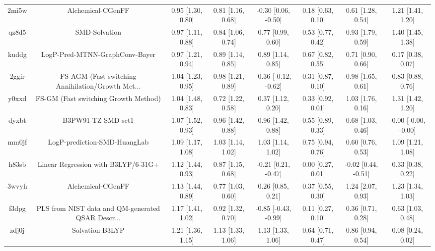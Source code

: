 \documentclass{article}
\begin{document}
\begin{center}
\begin{longtable}{|cccccccc|}
 2mi5w &                                  Alchemical-CGenFF &  0.95 [1.30, 0.80] &  0.81 [1.16, 0.68] &   -0.30 [0.06, -0.50] &  0.18 [0.63, 0.10] &     0.61 [1.28, 0.54] &     1.21 [1.41, 1.20] \\
 qz8d5 &                                      SMD-Solvation &  0.97 [1.11, 0.88] &  0.84 [1.06, 0.74] &     0.77 [0.99, 0.60] &  0.53 [0.77, 0.42] &     0.93 [1.79, 0.59] &     1.40 [1.45, 1.38] \\
 kuddg &                     LogP-Pred-MTNN-GraphConv-Bayer &  0.97 [1.21, 0.94] &  0.89 [1.14, 0.85] &     0.89 [1.14, 0.85] &  0.67 [0.82, 0.55] &     0.71 [0.90, 0.66] &     0.17 [0.38, 0.07] \\
 2ggir &  FS-AGM (Fast switching Annihilation/Growth Met... &  1.04 [1.23, 0.95] &  0.98 [1.21, 0.89] &  -0.36 [-0.12, -0.62] &  0.31 [0.87, 0.10] &     0.98 [1.65, 0.61] &     0.83 [0.88, 0.76] \\
 y0xxd &               FS-GM (Fast switching Growth Method) &  1.04 [1.48, 0.83] &  0.72 [1.22, 0.58] &     0.37 [1.12, 0.20] &  0.33 [0.92, 0.01] &     1.03 [1.76, 0.16] &     1.31 [1.42, 1.20] \\
 dyxbt &                                 B3PW91-TZ SMD set1 &  1.07 [1.52, 0.93] &  0.96 [1.42, 0.88] &     0.96 [1.42, 0.88] &  0.55 [0.89, 0.33] &     0.68 [1.03, 0.46] &  -0.00 [-0.00, -0.00] \\
 mm0jf &                       LogP-prediction-SMD-HuangLab &  1.09 [1.17, 1.08] &  1.03 [1.14, 1.02] &     1.03 [1.14, 1.02] &  0.75 [0.94, 0.76] &     0.60 [0.76, 0.53] &     1.09 [1.21, 1.08] \\
 h83sb &                Linear Regression with B3LYP/6-31G+ &  1.12 [1.44, 0.93] &  0.87 [1.15, 0.68] &   -0.21 [0.21, -0.47] &  0.00 [0.27, 0.01] &   -0.02 [0.44, -0.51] &     0.33 [0.38, 0.22] \\
 3wvyh &                                  Alchemical-CGenFF &  1.13 [1.44, 0.89] &  0.77 [1.03, 0.60] &     0.26 [0.85, 0.21] &  0.37 [0.55, 0.30] &     1.24 [2.07, 0.93] &     1.23 [1.34, 1.03] \\
 f3dpg &  PLS from NIST data and QM-generated QSAR Descr... &  1.17 [1.41, 1.02] &  0.92 [1.32, 0.70] &  -0.85 [-0.43, -0.99] &  0.11 [0.27, 0.10] &     0.36 [0.71, 0.28] &     0.63 [1.03, 0.48] \\
 zdj0j &                                    Solvation-B3LYP &  1.21 [1.36, 1.15] &  1.13 [1.33, 1.06] &     1.13 [1.33, 1.06] &  0.64 [0.71, 0.47] &     0.86 [0.94, 0.54] &     0.08 [0.24, 0.02] \\

\end{longtable}
\end{center}
\end{document}
